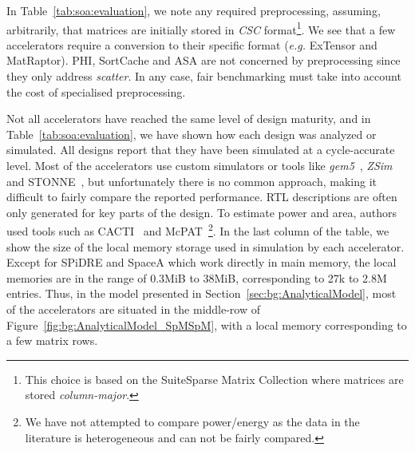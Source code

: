 
In Table~\ref{tab:soa:evaluation}, we note any required preprocessing, assuming, arbitrarily, that matrices are initially stored in \emph{CSC} format\footnote{This choice is based on the SuiteSparse Matrix Collection where matrices are stored \emph{column-major}.}. We see that a few accelerators require a conversion to their  specific format (\emph{e.g.} ExTensor and MatRaptor). PHI, SortCache and ASA are not concerned by preprocessing since they only address \emph{scatter}. In any case, fair benchmarking must take into account the cost of specialised preprocessing.

Not all accelerators have reached the same level of design maturity, and in Table~\ref{tab:soa:evaluation}, we have shown how each design was analyzed or simulated.
All designs report that they have been simulated at a cycle-accurate level. Most of the accelerators use custom simulators or tools like \emph{gem5}~\cite{Lowe2020_gem5}, \emph{ZSim}~\cite{SANCHEZ_2013_ZSIM} and STONNE~\cite{Munoz-Martinez2021_STONNE}, but unfortunately there is no common approach, making it difficult to fairly compare the reported performance. RTL descriptions are often only generated for key parts of the design. To estimate power and area, authors used tools such as CACTI~\cite{Balasubramonian2017_CACTI7} and McPAT~\cite{Li2009_McPAT}\footnote{We have not attempted to compare power/energy as the data in the literature is heterogeneous and can not be fairly compared.}.
In the last column of the table, we show the size of the local memory storage used in simulation by each accelerator. Except for SPiDRE and SpaceA which work directly in main memory, the local memories are in the range of 0.3MiB to 38MiB, corresponding to 27k to 2.8M entries. Thus, in the model presented in Section~\ref{sec:bg:AnalyticalModel}, most of the accelerators are situated in the middle-row of Figure~\ref{fig:bg:AnalyticalModel_SpMSpM}, with a local memory corresponding to a few matrix rows.

